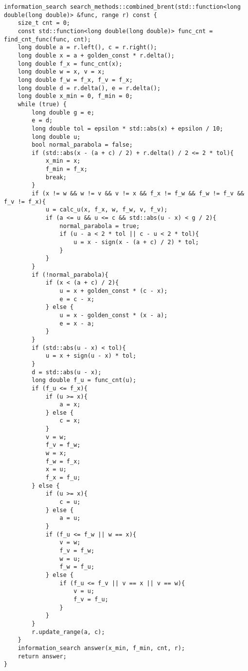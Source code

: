 \begin{lstlisting}
information_search search_methods::combined_brent(std::function<long double(long double)> &func, range r) const {
    size_t cnt = 0;
    const std::function<long double(long double)> func_cnt = find_cnt_func(func, cnt);
    long double a = r.left(), c = r.right();
    long double x = a + golden_const * r.delta();
    long double f_x = func_cnt(x);
    long double w = x, v = x;
    long double f_w = f_x, f_v = f_x;
    long double d = r.delta(), e = r.delta();
    long double x_min = 0, f_min = 0;
    while (true) {
        long double g = e;
        e = d;
        long double tol = epsilon * std::abs(x) + epsilon / 10;
        long double u;
        bool normal_parabola = false;
        if (std::abs(x - (a + c) / 2) + r.delta() / 2 <= 2 * tol){
            x_min = x;
            f_min = f_x;
            break;
        }
        if (x != w && w != v && v != x && f_x != f_w && f_w != f_v && f_v != f_x){
            u = calc_u(x, f_x, w, f_w, v, f_v);
            if (a <= u && u <= c && std::abs(u - x) < g / 2){
                normal_parabola = true;
                if (u - a < 2 * tol || c - u < 2 * tol){
                    u = x - sign(x - (a + c) / 2) * tol;
                }
            }
        }
        if (!normal_parabola){
            if (x < (a + c) / 2){
                u = x + golden_const * (c - x);
                e = c - x;
            } else {
                u = x - golden_const * (x - a);
                e = x - a;
            }
        }
        if (std::abs(u - x) < tol){
            u = x + sign(u - x) * tol;
        }
        d = std::abs(u - x);
        long double f_u = func_cnt(u);
        if (f_u <= f_x){
            if (u >= x){
                a = x;
            } else {
                c = x;
            }
            v = w;
            f_v = f_w;
            w = x;
            f_w = f_x;
            x = u;
            f_x = f_u;
        } else {
            if (u >= x){
                c = u;
            } else {
                a = u;
            }
            if (f_u <= f_w || w == x){
                v = w;
                f_v = f_w;
                w = u;
                f_w = f_u;
            } else {
                if (f_u <= f_v || v == x || v == w){
                    v = u;
                    f_v = f_u;
                }
            }
        }
        r.update_range(a, c);
    }
    information_search answer(x_min, f_min, cnt, r);
    return answer;
}
\end{lstlisting}